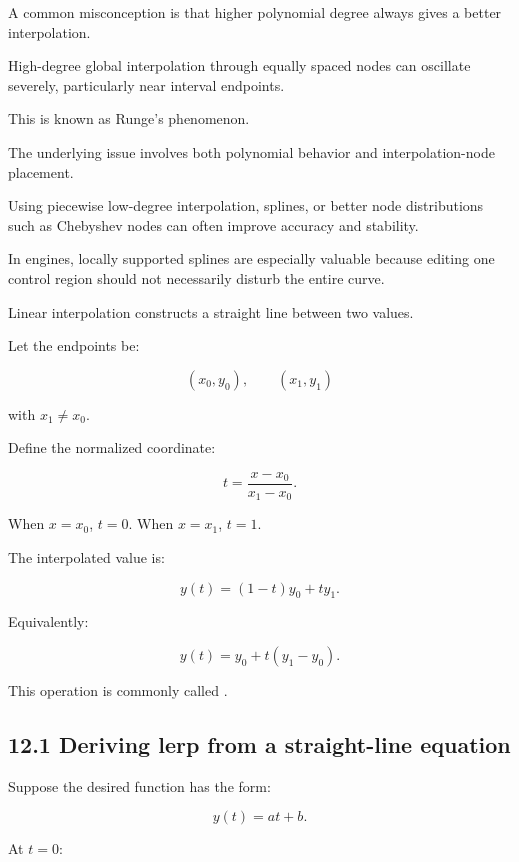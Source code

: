 \hypertarget{02-foundations-ii-ch028-high-degree-interpolation-and-runges-phenomenon}{}

A common misconception is that higher polynomial degree always gives a better interpolation.

High-degree global interpolation through equally spaced nodes can oscillate severely, particularly near interval endpoints.

This is known as Runge's phenomenon.

The underlying issue involves both polynomial behavior and interpolation-node placement.

Using piecewise low-degree interpolation, splines, or better node distributions such as Chebyshev nodes can often improve accuracy and stability.

In engines, locally supported splines are especially valuable because editing one control region should not necessarily disturb the entire curve.

Linear interpolation constructs a straight line between two values.

Let the endpoints be:

\[ (x_0,y_0),\qquad(x_1,y_1) \]

with \(x_1\ne x_0\).

Define the normalized coordinate:

\[ \boxed{ t=\frac{x-x_0}{x_1-x_0} }. \]

When \(x=x_0\), \(t=0\). When \(x=x_1\), \(t=1\).

The interpolated value is:

\[ \boxed{ y(t)=(1-t)y_0+ty_1 }. \]

Equivalently:

\[ \boxed{ y(t)=y_0+t(y_1-y_0) }. \]

This operation is commonly called .

\subsection{12.1 Deriving lerp from a straight-line equation}\label{02-foundations-ii-ch028-deriving-lerp-from-a-straight-line-equation}

\hypertarget{02-foundations-ii-ch028-deriving-lerp-from-a-straight-line-equation}{}

Suppose the desired function has the form:

\[ y(t)=at+b. \]

At \(t=0\):

